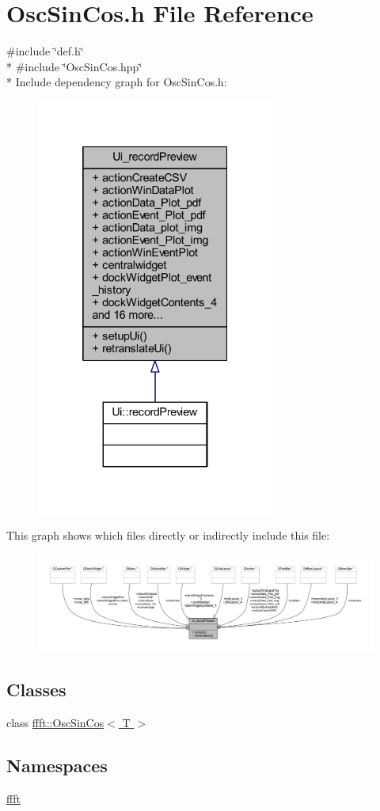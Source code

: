 \hypertarget{a00111}{\section{Osc\+Sin\+Cos.\+h File Reference}
\label{a00111}
}
{\ttfamily \#include \char`\"{}def.\+h\char`\"{}}\\*
{\ttfamily \#include \char`\"{}Osc\+Sin\+Cos.\+hpp\char`\"{}}\\*
Include dependency graph for Osc\+Sin\+Cos.\+h\+:
\nopagebreak
\begin{figure}[H]
\begin{center}
\leavevmode
\includegraphics[width=222pt]{da/de0/a00317}
\end{center}
\end{figure}
This graph shows which files directly or indirectly include this file\+:
\nopagebreak
\begin{figure}[H]
\begin{center}
\leavevmode
\includegraphics[width=350pt]{d2/d41/a00318}
\end{center}
\end{figure}
\subsection*{Classes}
\begin{DoxyCompactItemize}
\item 
class \hyperlink{a00020}{ffft\+::\+Osc\+Sin\+Cos$<$ T $>$}
\end{DoxyCompactItemize}
\subsection*{Namespaces}
\begin{DoxyCompactItemize}
\item 
 \hyperlink{a00142}{ffft}
\end{DoxyCompactItemize}
